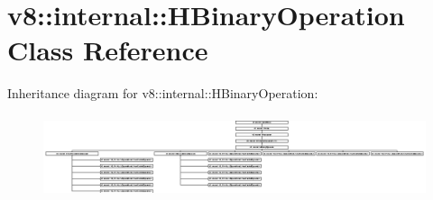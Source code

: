 \hypertarget{classv8_1_1internal_1_1_h_binary_operation}{}\section{v8\+:\+:internal\+:\+:H\+Binary\+Operation Class Reference}
\label{classv8_1_1internal_1_1_h_binary_operation}
Inheritance diagram for v8\+:\+:internal\+:\+:H\+Binary\+Operation\+:\begin{figure}[H]
\begin{center}
\leavevmode
\includegraphics[height=2.448980cm]{classv8_1_1internal_1_1_h_binary_operation}
\end{center}
\end{figure}
